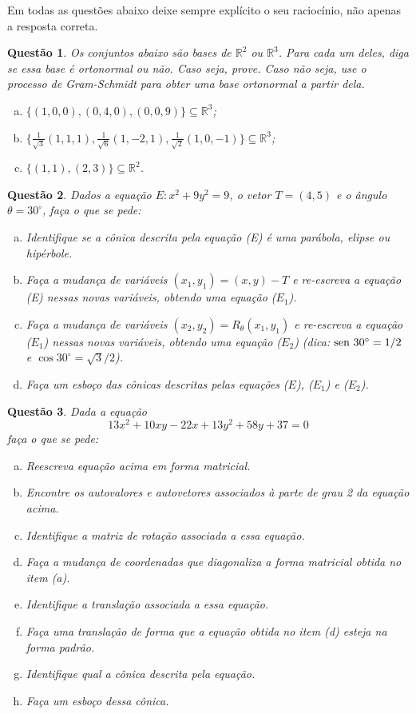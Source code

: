\documentclass[a4paper,12pt]{article}
\author{Terceira Prova - GAAL}
\date{27 de Junho de 2019}
\title{}
\def\R{\mathbb R}
\def\sen{{\rm sen\ }}
\newtheorem{qst}{Questão}
\begin{document}
\maketitle

Em todas as questões abaixo deixe sempre explícito o seu raciocínio, não apenas a resposta correta.

\begin{qst}
Os conjuntos abaixo são bases de $\R^2$ ou $\R^3$. Para cada um deles, diga se essa base é ortonormal ou não. Caso seja, prove. Caso não seja, use o processo de Gram-Schmidt para obter uma base ortonormal a partir dela.
\begin{enumerate}[a)]
	\item $\{(1,0,0),(0,4,0),(0,0,9)\}\subseteq \R^3$;
	\item $\{\frac{1}{\sqrt{3}}(1,1,1), \frac{1}{\sqrt{6}}(1,-2,1), \frac{1}{\sqrt{2}}(1,0,-1)\}\subseteq\R^3$;
	\item $\{(1,1),(2,3)\}\subseteq\R^2$.
\end{enumerate}
\end{qst}
\begin{qst}
	Dados a equação \(E:x^2+9y^2=9\), o vetor $T=(4,5)$ e o ângulo $\theta=30^\circ$, faça o que se pede:
	\begin{enumerate}[a)]
		\item Identifique se a cônica descrita pela equação (E) é uma parábola, elipse ou hipérbole.
		\item Faça a mudança de variáveis $(x_1,y_1)=(x,y)-T$ e re-escreva a equação (E) nessas novas variáveis, obtendo uma equação ($E_1$).
		\item Faça a mudança de variáveis $(x_2,y_2)=R_\theta(x_1,y_1)$ e re-escreva a equação ($E_1$) nessas novas variáveis, obtendo uma equação ($E_2$) (dica: $\sen 30^\circ=1/2$ e $\cos 30^\circ=\sqrt{3}/2$).
		\item Faça um esboço das cônicas descritas pelas equações ($E$), ($E_1$) e ($E_2$).
	\end{enumerate}
\end{qst}

\begin{qst}	
	Dada a equação \[13 x^2 + 10 x y - 22 x + 13 y^2 + 58 y + 37 = 0\]faça o que se pede:
	\begin{enumerate}[a)]
		\item Reescreva equação acima em forma matricial.
		\item Encontre os autovalores e autovetores associados à parte de grau 2 da equação acima.
		\item Identifique a matriz de rotação associada a essa equação.
		\item Faça a mudança de coordenadas que diagonaliza a forma matricial obtida no item (a).
		\item Identifique a translação associada a essa equação.
		\item Faça uma translação de forma que a equação obtida no item (d) esteja na forma padrão.
		\item Identifique qual a cônica descrita pela equação.
		\item Faça um esboço dessa cônica.
	\end{enumerate}
\end{qst}
\end{document}
